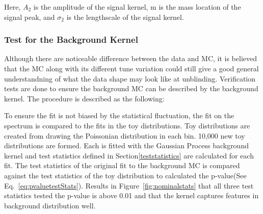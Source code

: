     Here, $A_{2}$ is the amplitude of the signal kernel, m is the mass location of the signal peak, and $\sigma_{2}$ is the lengthscale of the signal kernel. 

\subsubsection{Test for the Background Kernel}

Although there are noticeable difference between the data and MC, it is believed that the MC along with its different tune variation could still give a good general understandning of what the data shape may look like at unblinding. Verification tests are done to ensure the background MC can be described by the background kernel. The procedure is described as the following: 

To ensure the fit is not biased by the statistical fluctuation, the fit on the spectrum is compared to the fits in the toy distributions. Toy distributions are created from drawing the Poissonian distribution in each bin. 10,000 new toy distributions are formed. Each is fitted with the Gaussian Process background kernel and test statistics defined in Section\ref{teststatistics} are calculated for each fit. The test statistics of the original fit to the background MC is compared against the test statistics of
the toy distribution to calculated the p-value(See Eq.~\ref{eq:pvaluetestStats}). Results in Figure~\ref{fig:nominalstats} that all three test statistics tested the p-value is above 0.01 and that the kernel captures features in background distribution well. 

